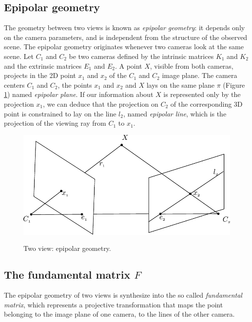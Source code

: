 \subsection{Epipolar geometry}
The geometry between two views is known as \emph{epipolar geometry}: it depends only on the camera parameters, and is independent from the structure of the observed scene.
The epipolar geometry originates whenever two cameras look at the same scene. 
Let $C_1$ and $C_2$ be two cameras defined by the intrinsic matrices $K_1$ and $K_2$ and the extrinsic matrices $E_1$ and $E_2$.
A point $X$,  visible from both cameras, projects in the 2D point $x_1$ and $x_2$ of the $C_1$ and   $C_2$ image plane.
The camera centers $C_1$ and $C_2$, the points $x_1$ and $x_2$ and $X$ lays on the same plane $\pi$ (Figure \ref{fig:epipolar}) named \emph{epipolar plane}. 
If our information about $X$ is represented only by the projection $x_1$, we can deduce that the projection on $C_2$ of the corresponding 3D point is constrained to lay on the line $l_2$, named \emph{epipolar line}, which is the projection of the viewing ray from $C_1$ to $x_1$.



\begin{figure}[t]
\centering
  \includegraphics[width=0.9\columnwidth]{./img/ch-camera/cameraEpipolar}\\
 \caption{Two view: epipolar geometry.}
 \label{fig:epipolar}
\end{figure}
\subsection{The fundamental matrix \texorpdfstring{$F$}{F}}
The epipolar geometry of two views is synthesize into the so called \emph{fundamental matrix}, which represents a projective transformation that maps the point belonging to the image plane of one camera, to the lines of the other camera.

